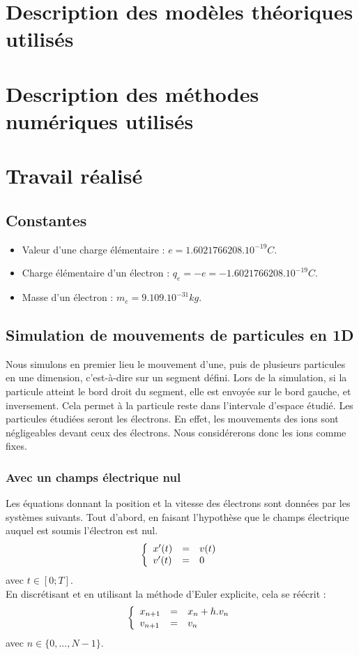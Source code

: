 \documentclass{article}
\begin{document}
\section{Description des modèles théoriques utilisés}
\section{Description des méthodes numériques utilisés}
\section{Travail réalisé}
\subsection*{Constantes}
\begin{itemize}
\item Valeur d'une charge élémentaire : $e = 1.6021766208.10^{-19} C$.
\item Charge élémentaire d'un électron : $q_e = -e = -1.6021766208.10^{-19} C$.
\item Masse d'un électron : $m_e = 9.109.10^{-31} kg$.
\end{itemize}
\subsection*{Simulation de mouvements de particules en 1D}
Nous simulons en premier lieu le mouvement d'une, puis de plusieurs particules en une dimension, c'est-à-dire sur un segment défini. Lors de la simulation, si la particule atteint le bord droit du segment, elle est envoyée sur le bord gauche, et inversement. Cela permet à la particule reste dans l'intervale d'espace étudié. Les particules étudiées seront les électrons. En effet, les mouvements des ions sont négligeables devant ceux des électrons. Nous considérerons donc les ions comme fixes.
\subsubsection*{Avec un champs électrique nul}
Les équations donnant la position et la vitesse des électrons sont données par les systèmes suivants. Tout d'abord, en faisant l'hypothèse que le champs électrique auquel est soumis l'électron est nul.
$$
\left \{
   \begin{array}{l l l}
      x'(t)  & = & v(t) \\
      v'(t)  & = & 0 \\
	\end{array}
\right.
$$
avec $t \in [0;T]$.\\
En discrétisant et en utilisant la méthode d'Euler explicite, cela se réécrit :
$$
\left \{
   \begin{array}{l l l}
      x_{n+1}  & = & x_n + h.v_n \\
      v_{n+1}  & = & v_n \\
	\end{array}
\right.
$$
avec $n \in \{0,...,N-1\}$.\\
\end{document}
